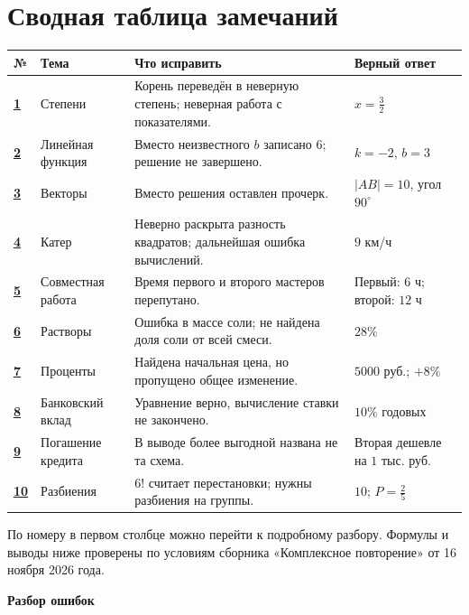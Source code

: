 \documentclass[a4paper,12pt]{article}
\begin{document}
\section*{\textcolor{accent}{Сводная таблица замечаний}}
\small
\renewcommand{\arraystretch}{1.3}
\begin{tabularx}{\linewidth}{@{}>{\raggedright\arraybackslash}p{0.6cm}>{\raggedright\arraybackslash}p{2.4cm}>{\raggedright\arraybackslash}X >{\raggedright\arraybackslash}p{2.45cm}@{}}
\toprule
\textbf{№} & \textbf{Тема} & \textbf{Что исправить} & \textbf{Верный ответ}\\
\midrule
\hyperref[task:1]{\textbf{1}} & Степени & Корень переведён в неверную степень; неверная работа с показателями. & $x=\frac32$\\
\hyperref[task:2]{\textbf{2}} & Линейная функция & Вместо неизвестного $b$ записано $6$; решение не завершено. & $k=-2$, $b=3$\\
\hyperref[task:3]{\textbf{3}} & Векторы & Вместо решения оставлен прочерк. & $|AB|=10$, угол $90^\circ$\\
\hyperref[task:4]{\textbf{4}} & Катер & Неверно раскрыта разность квадратов; дальнейшая ошибка вычислений. & $9$ км/ч\\
\hyperref[task:5]{\textbf{5}} & Совместная работа & Время первого и второго мастеров перепутано. & Первый: $6$ ч; второй: $12$ ч\\
\hyperref[task:6]{\textbf{6}} & Растворы & Ошибка в массе соли; не найдена доля соли от всей смеси. & $28\%$\\
\hyperref[task:7]{\textbf{7}} & Проценты & Найдена начальная цена, но пропущено общее изменение. & $5000$ руб.; $+8\%$\\
\hyperref[task:8]{\textbf{8}} & Банковский вклад & Уравнение верно, вычисление ставки не закончено. & $10\%$ годовых\\
\hyperref[task:9]{\textbf{9}} & Погашение кредита & В выводе более выгодной названа не та схема. & Вторая дешевле на $1$ тыс. руб.\\
\hyperref[task:10]{\textbf{10}} & Разбиения & $6!$ считает перестановки; нужны разбиения на группы. & $10$; $P=\frac25$\\
\bottomrule
\end{tabularx}
\normalsize
\vspace{5mm}
По номеру в первом столбце можно перейти к подробному разбору. Формулы и выводы ниже проверены по условиям сборника «Комплексное повторение» от 16 ноября 2026 года.

\clearpage
\thispagestyle{empty}
\vspace*{\fill}
\begin{center}{\LARGE\bfseries\color{accent} Разбор ошибок}\end{center}
\vspace*{\fill}
\end{document}
